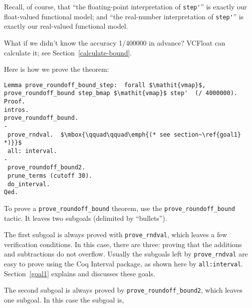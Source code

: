 \documentclass[article]{memoir}
\begin{document}
Recall, of course, that ``the floating-point interpretation of \lstinline{step'}'' is exactly our float-valued functional model;
and ``the real-number interpretation of \lstinline{step'}''
is exactly our real-valued functional model.

What if we didn't know the accuracy 1/400000 in advance?
VCFloat can calculate it; see Section~\ref{calculate-bound}.

Here is how we prove the theorem:
\begin{lstlisting}
Lemma prove_roundoff_bound_step:  forall $\mathit{vmap}$, prove_roundoff_bound step_bmap $\mathit{vmap}$ step'  (/ 4000000).
Proof.
intros.
prove_roundoff_bound.
-
 prove_rndval.  $\mbox{\qquad\qquad\emph{(* see section~\ref{goal1} *)}}$
 all: interval.
- 
 prove_roundoff_bound2.
 prune_terms (cutoff 30).
 do_interval.
Qed.
\end{lstlisting}
To prove a \lstinline{prove_roundoff_bound} theorem,
use the \lstinline{prove_roundoff_bound} tactic.
It leaves two subgoals (delimited by ``bullets'').

The first subgoal is always proved with \lstinline{prove_rndval},
which leaves a few verification conditions.
In this case, there are three: proving that the additions
and subtractions do not overflow.  Usually the subgoals
left by \lstinline{prove_rndval} are easy to prove using the Coq
Interval package, as shown here by \lstinline{all:interval}.
Section~\ref{goal1} explains and discusses these goals.

\pagebreak 

The second subgoal
is always proved by
\lstinline{prove_roundoff_bound2}, which leaves
one subgoal.  In this case the subgoal is,
\end{document}
